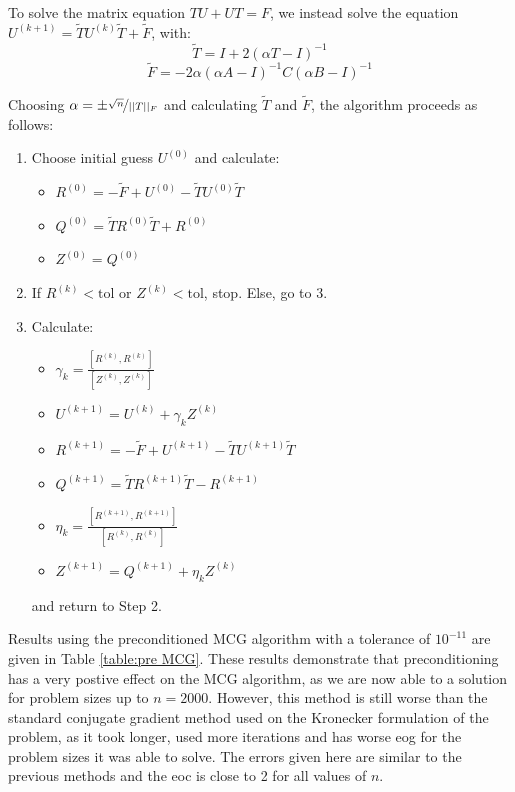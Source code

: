 \documentclass[11pt]{article}
\numberwithin{equation}{section}
\begin{document}
To solve the matrix equation $TU + UT = F$, we instead solve the equation $U^{(k+1)} = \widetilde{T}U^{(k)} \widetilde{T} + \widetilde{F}$, with:
\[ \widetilde{T} = I + 2(\alpha T - I)^{-1} \]
\[ \widetilde{F} = -2\alpha(\alpha A - I)^{-1} C (\alpha B - I)^{-1} \]

Choosing $\alpha = \pm \nicefrac{\sqrt{n}}{||T||_F}$ and calculating $\widetilde{T}$ and $\widetilde{F}$, the algorithm proceeds as follows:
\begin{enumerate}
\item Choose initial guess $U^{(0)}$ and calculate:
	\begin{itemize}
	\item $R^{(0)} = -\widetilde{F} + U^{(0)} - \widetilde{T}U^{(0)} \widetilde{T}$
	\item $Q^{(0)} = \widetilde{T} R^{(0)}\widetilde{T} + R^{(0)}$
	\item $Z^{(0)} = Q^{(0)}$
	\end{itemize}
\item If $R^{(k)} < \text{tol}$ or $Z^{(k)} < \text{tol}$, stop. Else, go to 3.
\item Calculate:
	\begin{itemize}
	\item $ \gamma_k = \frac{[R^{(k)}, R^{(k)}]}{[Z^{(k)}, Z^{(k)}]}$
	\item $U^{(k+1)} = U^{(k)} + \gamma_k Z^{(k)} $
	\item $R^{(k+1)} = -\widetilde{F} + U^{(k+1)} - \widetilde{T}U^{(k+1)} \widetilde{T}$
	\item $Q^{(k+1)} = \widetilde{T} R^{(k+1)}\widetilde{T} - R^{(k+1)}$
	\item $\eta_k = \frac{[R^{(k+1)}, R^{(k+1)}]}{[R^{(k)}, R^{(k)}]}$ 
	\item $Z^{(k+1)} = Q^{(k+1)} + \eta_k Z^{(k)}$
	\end{itemize}
	and return to Step 2.
\end{enumerate}

Results using the preconditioned MCG algorithm with a tolerance of $10^{-11}$ are given in Table \ref{table:pre MCG}. These results demonstrate that preconditioning has a very postive effect on the MCG algorithm, as we are now able to a solution for problem sizes up to $n=2000$. However, this method is still worse than the standard conjugate gradient method used on the Kronecker formulation of the problem, as it took longer, used more iterations and has worse eog for the problem sizes it was able to solve. The errors given here are similar to the previous methods and the eoc is close to 2 for all values of $n$. 
\end{document}
